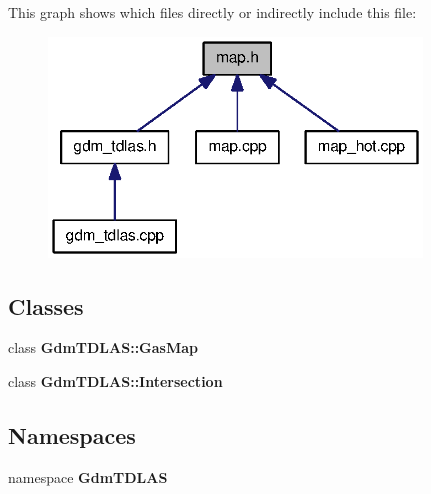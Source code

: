This graph shows which files directly or indirectly include this file:
\nopagebreak
\begin{figure}[H]
\begin{center}
\leavevmode
\includegraphics[width=281pt]{map_8h__dep__incl}
\end{center}
\end{figure}
\subsection*{Classes}
\begin{DoxyCompactItemize}
\item 
class {\bf GdmTDLAS::GasMap}
\item 
class {\bf GdmTDLAS::Intersection}
\end{DoxyCompactItemize}
\subsection*{Namespaces}
\begin{DoxyCompactItemize}
\item 
namespace {\bf GdmTDLAS}
\end{DoxyCompactItemize}
